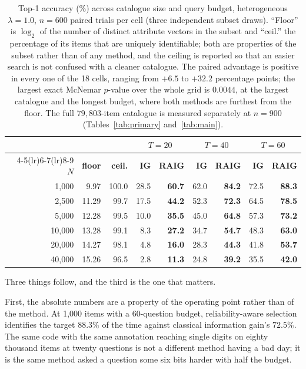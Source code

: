 \begin{table}[t]
\caption{Top-1 accuracy (\%) across catalogue size and query budget,
heterogeneous $\lambda = 1.0$, $n = 600$ paired trials per cell (three
independent subset draws). ``Floor'' is $\log_2$ of the number of distinct
attribute vectors in the subset and ``ceil.'' the percentage of its items
that are uniquely identifiable; both are properties of the subset rather than
of any method, and the ceiling is reported so that an easier search is not
confused with a cleaner catalogue. The paired advantage is positive in every one of the 18 cells,
ranging from $+6.5$ to $+32.2$ percentage points; the largest
exact McNemar $p$-value over the whole grid is $0.0044$, at the largest
catalogue and the longest budget, where both methods are furthest from the
floor. The full $79{,}803$-item catalogue is
measured separately at $n=900$ (Tables~\ref{tab:primary}
and~\ref{tab:main}).}
\label{tab:size}
\centering
\scriptsize
\begin{tabular}{@{}rrrrrrrrr@{}}
\toprule
& & & \multicolumn{2}{c}{$T=20$} & \multicolumn{2}{c}{$T=40$} & \multicolumn{2}{c}{$T=60$} \\
\cmidrule(lr){4-5}\cmidrule(lr){6-7}\cmidrule(lr){8-9}
\textbf{$N$} & \textbf{floor} & \textbf{ceil.} & \textbf{IG} & \textbf{RAIG} & \textbf{IG} & \textbf{RAIG} & \textbf{IG} & \textbf{RAIG} \\
\midrule
1{,}000 & 9.97 & 100.0 & 28.5 & \textbf{60.7} & 62.0 & \textbf{84.2} & 72.5 & \textbf{88.3} \\
2{,}500 & 11.29 & 99.7 & 17.5 & \textbf{44.2} & 52.3 & \textbf{72.3} & 64.5 & \textbf{78.5} \\
5{,}000 & 12.28 & 99.5 & 10.0 & \textbf{35.5} & 45.0 & \textbf{64.8} & 57.3 & \textbf{73.2} \\
10{,}000 & 13.28 & 99.1 & 8.3 & \textbf{27.2} & 34.7 & \textbf{54.7} & 48.3 & \textbf{63.0} \\
20{,}000 & 14.27 & 98.1 & 4.8 & \textbf{16.0} & 28.3 & \textbf{44.3} & 41.8 & \textbf{53.7} \\
40{,}000 & 15.26 & 96.5 & 2.8 & \textbf{11.3} & 24.8 & \textbf{39.2} & 35.5 & \textbf{42.0} \\
\bottomrule
\end{tabular}
\end{table}

Three things follow, and the third is the one that matters.

First, the absolute numbers are a property of the operating point rather than
of the method. At 1{,}000 items with a 60-question budget,
reliability-aware selection identifies the target $88.3\%$ of the time
against classical information gain's $72.5\%$. The same code with the same
annotation reaching single digits on eighty thousand items at twenty questions
is not a different method having a bad day; it is the same method asked a
question some six bits harder with half the budget.

